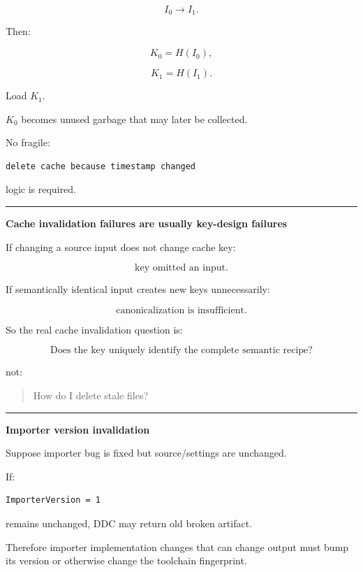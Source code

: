 \[
I_0\rightarrow I_1.
\]

Then:

\[
K_0=H(I_0),
\]

\[
K_1=H(I_1).
\]

Load \(K_1\).

\(K_0\) becomes unused garbage that may later be collected.

No fragile:

\begin{verbatim}
delete cache because timestamp changed
\end{verbatim}

logic is required.

\begin{center}\rule{0.5\linewidth}{0.5pt}\end{center}

\textbf{Cache invalidation failures are usually key-design failures}

If changing a source input does not change cache key:

\[
\text{key omitted an input}.
\]

If semantically identical input creates new keys unnecessarily:

\[
\text{canonicalization is insufficient}.
\]

So the real cache invalidation question is:

\[
\boxed{
\text{Does the key uniquely identify the complete semantic recipe?}
}
\]

not:

\begin{quote}
How do I delete stale files?
\end{quote}

\begin{center}\rule{0.5\linewidth}{0.5pt}\end{center}

\textbf{Importer version invalidation}

Suppose importer bug is fixed but source/settings are unchanged.

If:

\begin{verbatim}
ImporterVersion = 1
\end{verbatim}

remains unchanged, DDC may return old broken artifact.

Therefore importer implementation changes that can change output must bump its version or otherwise change the toolchain fingerprint.

